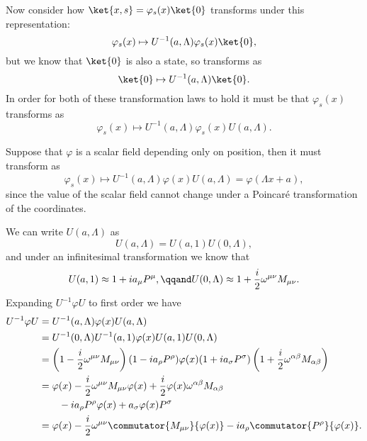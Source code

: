 \documentclass[fleqn]{NotesClass}
\newcommand{\ident}{1}
\begin{document}
    Now consider how \(\ket{x, s} = \varphi_s(x)\ket{0}\) transforms under this representation:
    \begin{equation}
        \varphi_s(x) \mapsto U^{-1}(a, \Lambda) \varphi_s(x)\ket{0},
    \end{equation}
    but we know that \(\ket{0}\) is also a state, so transforms as
    \begin{equation}
        \ket{0} \mapsto U^{-1}(a, \Lambda)\ket{0}.
    \end{equation}
    In order for both of these transformation laws to hold it must be that \(\varphi_s(x)\) transforms as
    \begin{equation}
        \varphi_s(x) \mapsto U^{-1}(a, \Lambda) \varphi_s(x) U(a, \Lambda).
    \end{equation}
    
    Suppose that \(\varphi\) is a scalar field depending only on position, then it must transform as
    \begin{equation}
        \varphi_s(x) \mapsto U^{-1}(a, \Lambda) \varphi(x) U(a, \Lambda) = \varphi(\Lambda x + a),
    \end{equation}
    since the value of the scalar field cannot change under a Poincar\'e transformation of the coordinates.
    
    We can write \(U(a, \Lambda)\) as
    \begin{equation}
        U(a, \Lambda) = U(a, \ident) U(0, \Lambda),
    \end{equation}
    and under an infinitesimal transformation we know that
    \begin{equation}
        U(a, \ident) \approx 1 + ia_\mu P^\mu, \qqand U(0, \Lambda) \approx 1 + \frac{i}{2}\omega^{\mu\nu}M_{\mu\nu}.
    \end{equation}
    Expanding \(U^{-1}\varphi U\) to first order we have
    \begin{align}
        U^{-1}\varphi U &= U^{-1}(a, \Lambda)\varphi(x)U(a, \Lambda)\\
        &= U^{-1}(0, \Lambda)U^{-1}(a, \ident) \varphi(x) U(a, \ident) U(0, \Lambda)\\
        &= \left( 1 - \frac{i}{2}\omega^{\mu\nu}M_{\mu\nu} \right)(1 - ia_\rho P^\rho) \varphi(x) (1 + ia_\sigma P^\sigma)\left( 1 + \frac{i}{2}\omega^{\alpha\beta}M_{\alpha\beta} \right)\notag\\
        &= \varphi(x) - \frac{i}{2}\omega^{\mu\nu}M_{\mu\nu}\varphi(x) + \frac{i}{2}\varphi(x)\omega^{\alpha\beta}M_{\alpha\beta}\\
        &\qquad- ia_\rho P^\rho \varphi(x) + a_\sigma\varphi(x) P^\sigma\\
        &= \varphi(x) - \frac{i}{2}\omega^{\mu\nu} \commutator{M_{\mu\nu}}{\varphi(x)} - ia_\rho \commutator{P^\rho}{\varphi(x)}.
    \end{align}
    
\end{document}
